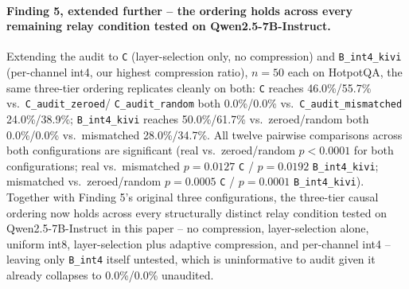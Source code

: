 \documentclass[11pt]{article}
\begin{document}
\paragraph{Finding 5, extended further -- the ordering holds across every
remaining relay condition tested on Qwen2.5-7B-Instruct.} Extending the
audit to \texttt{C} (layer-selection only, no compression) and
\texttt{B\_int4\_kivi} (per-channel int4, our highest compression ratio),
$n=50$ each on HotpotQA, the same three-tier ordering replicates cleanly
on both: \texttt{C} reaches 46.0\%/55.7\% vs.\ \texttt{C\_audit\_zeroed}/
\texttt{C\_audit\_random} both 0.0\%/0.0\% vs.\ \texttt{C\_audit\_mismatched}
24.0\%/38.9\%; \texttt{B\_int4\_kivi} reaches 50.0\%/61.7\% vs.\
zeroed/random both 0.0\%/0.0\% vs.\ mismatched 28.0\%/34.7\%. All twelve
pairwise comparisons across both configurations are significant (real
vs.\ zeroed/random $p<0.0001$ for both configurations; real vs.\
mismatched $p=0.0127$ \texttt{C} / $p=0.0192$ \texttt{B\_int4\_kivi};
mismatched vs.\ zeroed/random $p=0.0005$ \texttt{C} / $p=0.0001$
\texttt{B\_int4\_kivi}). Together with Finding 5's original three
configurations, the three-tier causal ordering now holds across every
structurally distinct relay condition tested on Qwen2.5-7B-Instruct in
this paper -- no compression, layer-selection alone, uniform int8,
layer-selection plus adaptive compression, and per-channel int4 --
leaving only \texttt{B\_int4} itself untested, which is uninformative to
audit given it already collapses to 0.0\%/0.0\% unaudited.
\end{document}
